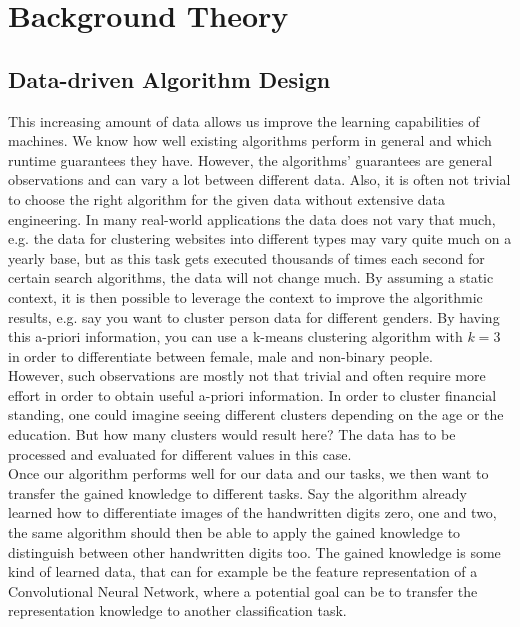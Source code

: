 \chapter{Background Theory}
\label{chapter:background}

\section{Data-driven Algorithm Design}

This increasing amount of data allows us improve the learning capabilities of machines. We know how well existing algorithms perform in general and which runtime guarantees they have. However, the algorithms' guarantees are general observations and can vary a lot between different data. Also, it is often not trivial to choose the right algorithm for the given data without extensive data engineering. In many real-world applications the data does not vary that much, e.g. the data for clustering websites into different types may vary quite much on a yearly base, but as this task gets executed thousands of times each second for certain search algorithms, the data will not change much. By assuming a static context, it is then possible to leverage the context to improve the algorithmic results, e.g. say you want to cluster person data for different genders. By having this a-priori information, you can use a k-means clustering algorithm with $k = 3$ in order to differentiate between female, male and non-binary people.\\

However, such observations are mostly not that trivial and often require more effort in order to obtain useful a-priori information. In order to cluster financial standing, one could imagine seeing different clusters depending on the age or the education. But how many clusters would result here? The data has to be processed and evaluated for different values in this case.\\

Once our algorithm performs well for our data and our tasks, we then want to transfer the gained knowledge to different tasks. Say the algorithm already learned how to differentiate images of the handwritten digits zero, one and two, the same algorithm should then be able to apply the gained knowledge to distinguish between other handwritten digits too. The gained knowledge is some kind of learned data, that can for example be the feature representation of a Convolutional Neural Network, where a potential goal can be to transfer the representation knowledge to another classification task.\\

